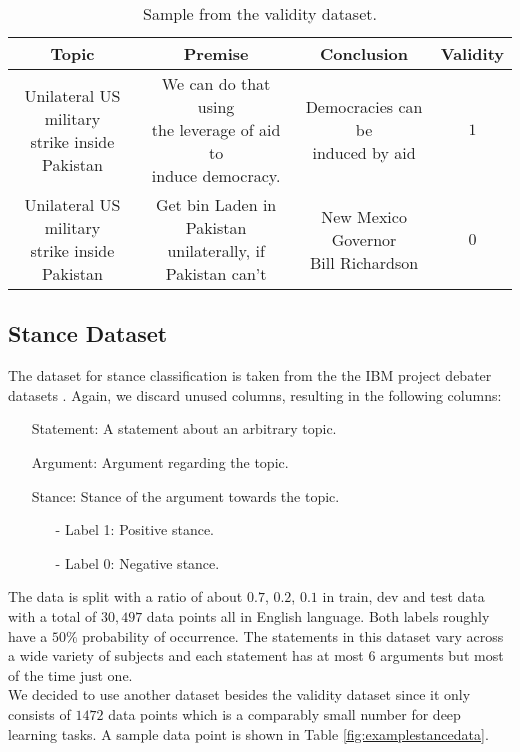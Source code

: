 \begin{table}[H]
	\begin{center}
	\footnotesize
   	\begin{tabular}{|| c | c | c | c||}
   	\hline
   	Topic & Premise & Conclusion & Validity \\
   	\hline\hline
   	\makecell{Unilateral US military \\ strike inside Pakistan} & \makecell{We can do that using \\ the leverage of aid to \\ induce democracy.} & \makecell{Democracies can be \\ induced by aid} & $1$ \\
   	\hline
   	\makecell{Unilateral US military \\ strike inside Pakistan} & \makecell{Get bin Laden in Pakistan \\ unilaterally, if Pakistan can't} & \makecell{New Mexico Governor \\ Bill Richardson} & $0$ \\
 	\hline
	\end{tabular}
  \end{center}
	\caption{Sample from the validity dataset.}%
  	\label{fig:examplevaliditydata}
\end{table}

\subsection{Stance Dataset} \label{sec:stancedata}

The dataset for stance classification is taken from the the IBM project debater datasets \cite{stancedata, ibm}. Again, we discard unused columns, resulting in the following columns:
\begin{enumerate}
	\item[\textbullet] Statement: A statement about an arbitrary topic.
	\item[\textbullet] Argument: Argument regarding the topic.
	\item[\textbullet] Stance: Stance of the argument towards the topic.
	\begin{enumerate}
		\item[-] Label 1: Positive stance.
		\item[-] Label 0: Negative stance.
	\end{enumerate}
\end{enumerate}
The data is split with a ratio of about $0.7$, $0.2$, $0.1$ in train, dev and test data with a total of $30,497$ data points all in English language. Both labels roughly have a $50\%$ probability of occurrence. The statements in this dataset vary across a wide variety of subjects and each statement has at most $6$ arguments \cite{stancedata} but most of the time just one. \\
We decided to use another dataset besides the validity dataset since it only consists of $1472$ data points which is a comparably small number for deep learning tasks. A sample data point is shown in Table \ref{fig:examplestancedata}.


